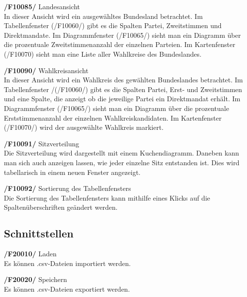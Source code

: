 \documentclass[10pt,a4paper]{article}
\begin{document}
\begin{list}{\quad}{}
	\item \textbf{/F10085/} Landesansicht \hfill \\
	In dieser Ansicht wird ein ausgewähltes Bundesland betrachtet. Im Tabellenfenster (/F10060/) gibt es die Spalten Partei, Zweitstimmen und Direktmandate. Im Diagrammfenster (/F10065/) sieht man ein Diagramm über die prozentuale Zweitstimmenanzahl der einzelnen Parteien. Im Kartenfenster (/F10070) sieht man eine Liste aller Wahlkreise des Bundeslandes. \hfill \\
	\item \textbf{/F10090/} Wahlkreisansicht \hfill \\
	In dieser Ansicht wird ein Wahlkreis des gewählten Bundeslandes betrachtet. Im Tabellenfenster /(/F10060/) gibt es die  Spalten Partei, Erst- und Zweitstimmen und eine Spalte, die anzeigt ob die jeweilige Partei ein Direktmandat erhält. Im Diagrammfenster (/F10065/) sieht man ein Diagramm über die prozentuale Erststimmenanzahl der einzelnen Wahlkreiskandidaten. Im Kartenfenster (/F10070/) wird der ausgewählte Wahlkreis markiert. \hfill \\
	\item \textbf{/F10091/} Sitzverteilung \hfill \\
	Die Sitzverteilung wird dargestellt mit einem Kuchendiagramm. Daneben kann man sich auch anzeigen lassen, wie jeder einzelne Sitz entstanden ist. Dies wird tabellarisch in einem neuen Fenster angezeigt. \hfill \\
	\item \textbf{/F10092/} Sortierung des Tabellenfensters \hfill \\
	Die Sortierung des Tabellenfensters kann mithilfe eines Klicks auf die Spaltenüberschriften geändert werden. \hfill \\
\end{list}

\subsection{Schnittstellen}
\begin{list}{\quad}{}
	\item \textbf{/F20010/} Laden \hfill \\
	Es können .csv-Dateien importiert werden.
	\item \textbf{/F20020/} Speichern \hfill \\
	Es können .csv-Dateien exportiert werden.
\end{list}
\end{document}
